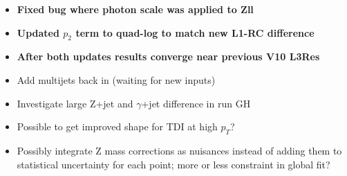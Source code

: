 \documentclass[landscape,10pt]{beamer} %
\begin{document}
\begin{itemize}
\item {\bf{Fixed bug where photon scale was applied to Zll}}
\item {\bf{Updated $p_{2}$ term to quad-log to match new L1-RC difference}}
\item {\bf{After both updates results converge near previous V10 L3Res}}
\item Add multijets back in (waiting for new inputs)
\item Investigate large Z+jet and $\gamma$+jet difference in run GH
\item Possible to get improved shape for TDI at high $p_T$?
\item Possibly integrate Z mass corrections as nuisances instead of adding them to statistical uncertainty for each point; more or less constraint in global fit?
\end{itemize}
\end{document}
